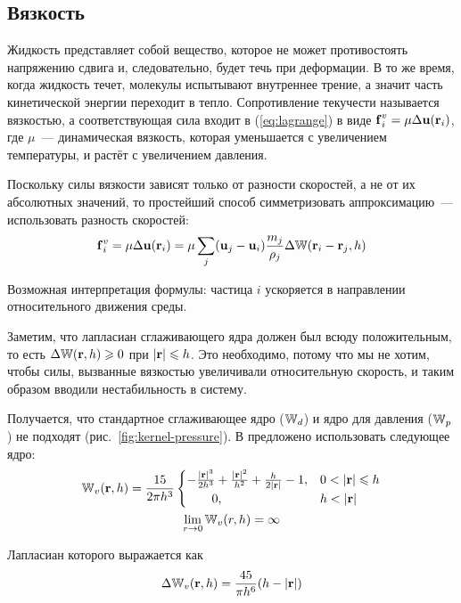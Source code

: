 \subsection{Вязкость}
Жидкость представляет собой вещество, которое не может противостоять напряжению сдвига и, следовательно, будет течь при деформации. В то же время, когда жидкость течет, молекулы испытывают внутреннее трение, а значит часть кинетической энергии переходит в тепло. Сопротивление текучести называется вязкостью, а соответствующая сила входит в (\ref{eq:lagrange}) в виде $\boldsymbol{\mathbf{f}}_i^v=\mu\Delta\boldsymbol{\mathbf{u}}(\boldsymbol{\mathbf{r}}_i)$, где $\mu$~--- динамическая вязкость, которая уменьшается с увеличением температуры, и растёт с увеличением давления.

Поскольку силы вязкости зависят только от разности скоростей, а не от их абсолютных значений, то простейший способ симметризовать аппроксимацию~--- использовать разность скоростей:
\[ \boldsymbol{\mathbf{f}}_i^v=\mu\Delta\boldsymbol{\mathbf{u}}(\boldsymbol{\mathbf{r}}_i)=\mu\sum_{j}(\boldsymbol{\mathbf{u}}_j-\boldsymbol{\mathbf{u}}_i)\frac{m_j}{\rho_j}\Delta\mathbb W(\boldsymbol{\mathbf{r}}_i-\boldsymbol{\mathbf{r}}_j, h) \]

Возможная интерпретация формулы: частица $i$ ускоряется в направлении относительного движения среды.

Заметим, что лапласиан сглаживающего ядра должен был всюду положительным, то есть $\Delta\mathbb W(\boldsymbol{\mathbf{r}}, h)\geqslant0$ при $|\boldsymbol{\mathbf{r}}|\leqslant h$. Это необходимо, потому что мы не хотим, чтобы силы, вызванные вязкостью увеличивали относительную скорость, и таким образом вводили нестабильность в систему.

Получается, что стандартное сглаживающее ядро ($\mathbb W_d$) и ядро для давления ($\mathbb W_p$) не подходят (рис.~\ref{fig:kernel-pressure}). В \cite{muller} предложено использовать следующее ядро:
\begin{equation}
  \begin{gathered}
    \kernel_v(\vect r, h)=\frac{15}{2\pi h^3}
    \begin{cases}
      -\frac{|\vect r|^3}{2h^3}+\frac{|\vect r|^2}{h^2}+\frac{h}{2|\vect r|}-1, & 0<|\vect r|\leq h\\
      \qquad 0, & h<|\vect r|
    \end{cases}\\
    \lim_{r\to 0}\kernel_v(r, h)=\infty
  \end{gathered}
\end{equation}

Лапласиан которого выражается как
\begin{equation}
  \Delta\mathbb W_v(\boldsymbol{\mathbf{r}}, h)=\frac{45}{\pi h^6}(h-|\boldsymbol{\mathbf{r}}|)
\end{equation}


